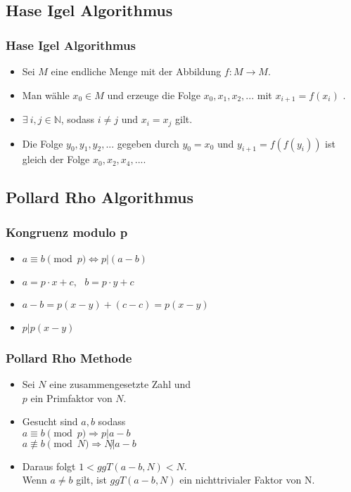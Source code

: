 \documentclass[mathserif, compress]{beamer}
\begin{document}
\subsection{Hase Igel Algorithmus}

\begin{frame}
  \frametitle{Hase Igel Algorithmus}
  \begin{itemize}
    \item<1-> Sei $M$ eine endliche Menge mit der Abbildung $f : M \rightarrow M$.
      \vspace{3mm}
    \item<2-> Man w\"ahle $x_0 \in M$ und erzeuge die Folge $x_0, x_1, x_2,...$ mit $x_{i+1} = f(x_i)$ .
      \vspace{3mm}
    \item<3-> $\exists \ i,j \in \mathbb{N}$, sodass $i \not= j$ und $x_i = x_j$ gilt.
      \vspace{3mm}
    \item<4-> Die Folge $y_0, y_1, y_2,...$ gegeben durch $y_0=x_0$ und $y_{i+1}=f(f(y_i))$ ist gleich der Folge $x_0,x_2,x_4,...$.
  \end{itemize}
\end{frame}


\subsection{Pollard Rho Algorithmus}

\begin{frame}
  \frametitle{Kongruenz modulo p}
  \begin{itemize}
	\item<1->$a \equiv b \pmod p \Leftrightarrow p|(a-b)$
\vspace{3mm}
	\item<2->$a=p\cdot x +c,\ \ \ b= p\cdot y +c$
\vspace{3mm}
	\item<3->$a-b=p(x-y)+(c-c)=p(x-y)$
\vspace{3mm}
	\item<4->$p|p(x-y)$
  \end{itemize}
\end{frame}



\begin{frame}
  \frametitle{Pollard Rho Methode}
  \begin{itemize}
    \item<1-> Sei $N$ eine zusammengesetzte Zahl und \\$p$ ein Primfaktor von $N$.
      \vspace{3mm}
    \item<2-> Gesucht sind $a, b$ sodass\\
              $a \equiv b \pmod p \Rightarrow p|a-b$ \\
              $a \not \equiv b \pmod N \Rightarrow N \not | a-b$
      \vspace{3mm}
    \item<3-> Daraus folgt $1<ggT(a-b,N)< N$. \\Wenn $a\not = b$ gilt, ist $ggT(a-b,N)$ ein nichttrivialer Faktor von N.
  \end{itemize}
\end{frame}
\end{document}
